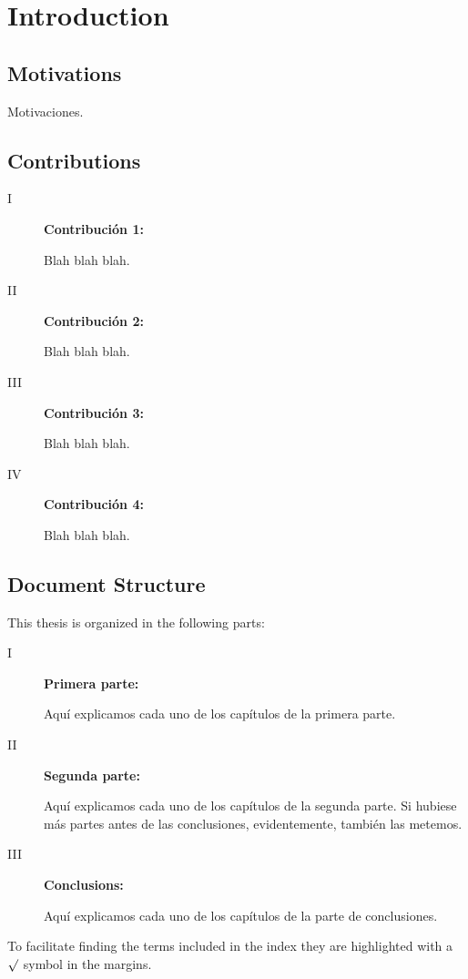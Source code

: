 \chapter{Introduction}

\section{Motivations}
Motivaciones.


\section{Contributions}

\begin{description}
\item[I] \begin{flushleft}\textbf{Contribución 1:}\end{flushleft}
Blah blah blah.

\item[II] \begin{flushleft}\textbf{Contribución 2:}\end{flushleft}
Blah blah blah.

\item[III] \begin{flushleft}\textbf{Contribución 3:}\end{flushleft}
Blah blah blah.

\item[IV] \begin{flushleft}\textbf{Contribución 4:}\end{flushleft}
Blah blah blah.


\end{description}



\section{Document Structure}
This thesis is organized in the following parts:
\begin{description}

\item[I] \begin{flushleft}\textbf{Primera parte:}\end{flushleft}
Aquí explicamos cada uno de los capítulos de la primera parte.

\item[II] \begin{flushleft}\textbf{Segunda parte:}\end{flushleft}
Aquí explicamos cada uno de los capítulos de la segunda parte. Si hubiese más partes antes de las conclusiones, evidentemente, también las metemos.

\item[III] \begin{flushleft}\textbf{Conclusions:}\end{flushleft}
Aquí explicamos cada uno de los capítulos de la parte de conclusiones.


\end{description}

To facilitate finding the terms included in the index they are highlighted with a $\surd$ 
\checkoddpage
\ifthenelse
{}
{\marginnote{\termMarkOdd}}
{\marginnote{\termMarkEven}}
symbol in the margins.


